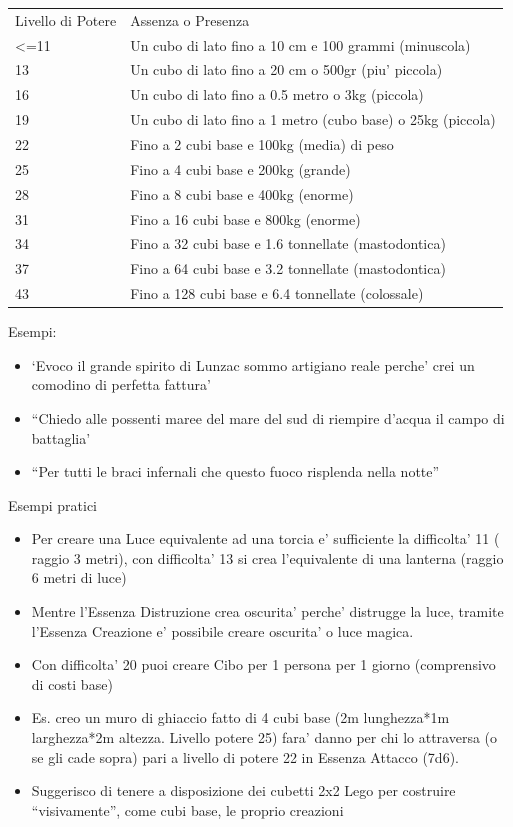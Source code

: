 \documentclass[a4paper,11pt,twoside,openany]{dndbook}
\begin{document}
\begin{tabular}[c]{@{}ll@{}}
\toprule 
Livello di Potere & Assenza o Presenza\tabularnewline
\textless=11 & Un cubo di lato fino a 10 cm e 100 grammi (minuscola)\tabularnewline
13 & Un cubo di lato fino a 20 cm o 500gr (piu' piccola)\tabularnewline
16 & Un cubo di lato fino a 0.5 metro o 3kg (piccola)\tabularnewline
19 & Un cubo di lato fino a 1 metro (cubo base) o 25kg (piccola)\tabularnewline
22 & Fino a 2 cubi base e 100kg (media) di peso\tabularnewline
25 & Fino a 4 cubi base e 200kg (grande)\tabularnewline
28 & Fino a 8 cubi base e 400kg (enorme)\tabularnewline
31 & Fino a 16 cubi base e 800kg (enorme)\tabularnewline
34 & Fino a 32 cubi base e 1.6 tonnellate (mastodontica)\tabularnewline
37 & Fino a 64 cubi base e 3.2 tonnellate (mastodontica)\tabularnewline
43 & Fino a 128 cubi base e 6.4 tonnellate (colossale)\tabularnewline
\bottomrule
\end{tabular}

\bigskip

Esempi:
\begin{itemize}
\item `Evoco il grande spirito di Lunzac sommo artigiano reale perche' crei un comodino di perfetta fattura' 
\item ``Chiedo alle possenti maree del mare del sud di riempire d'acqua il campo di battaglia' 
\item ``Per tutti le braci infernali che questo fuoco risplenda nella notte'' 
\end{itemize}

\bigskip

Esempi pratici
\begin{itemize}
\item Per creare una Luce equivalente ad una torcia e' sufficiente la difficolta' 11 ( raggio 3 metri), con difficolta' 13 si crea l'equivalente di una lanterna (raggio 6 metri di luce) 
\item Mentre l'Essenza Distruzione crea oscurita' perche' distrugge la luce, tramite l'Essenza Creazione e' possibile creare oscurita' o luce magica. 
\item Con difficolta' 20 puoi creare Cibo per 1 persona per 1 giorno (comprensivo di costi base) 
\item Es. creo un muro di ghiaccio fatto di 4 cubi base (2m lunghezza{*}1m larghezza{*}2m altezza. Livello potere 25) fara' danno per chi lo attraversa (o se gli cade sopra) pari a livello di potere 22 in Essenza Attacco (7d6). 
\item Suggerisco di tenere a disposizione dei cubetti 2x2 Lego per costruire ``visivamente'', come cubi base, le proprio creazioni 
\end{itemize}
\end{document}
